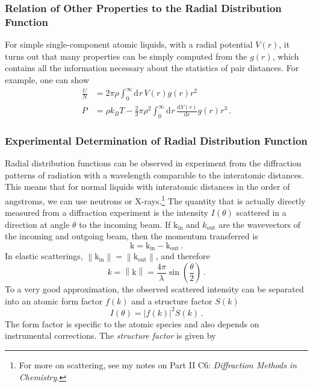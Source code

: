 \documentclass{article}
\theoremstyle{plain}\theoremheaderfont{\normalfont\itshape}\theorembodyfont{\rmfamily}\theoremseparator{.}\newtheorem*{rem}{Remark}\newtheorem*{ex}{Example}\newtheorem*{proof}{Proof}\newtheorem*{altp}{Alternative proof}
\theoremstyle{plain}\theoremheaderfont{\normalfont\bfseries}\theorembodyfont{\rmfamily}\theoremseparator{.}\newtheorem{thm}{Theorem}[section]\newtheorem{lem}[thm]{Lemma}\newtheorem{prop}[thm]{Proposition}\newtheorem*{cor}{Corollary}\newtheorem{defn}[thm]{Definition}\newtheorem{clm}[thm]{Claim}\newtheorem{clminproof}{Claim}\newtheorem{alg}[thm]{Algorithm}\newtheorem{hyp}[thm]{Hypothesis}\newtheorem{law}[thm]{Law}
\theoremstyle{break}\theoremheaderfont{\normalfont\itshape}\theorembodyfont{\rmfamily}\theoremseparator{.\medskip}\newtheorem*{proofskip}{Proof}\newtheorem*{exs}{Examples}\newtheorem*{rems}{Remarks}
\theoremstyle{break}\theoremheaderfont{\normalfont\bfseries}\theorembodyfont{\rmfamily}\theoremseparator{.\medskip}\newtheorem{lemskip}[thm]{Lemma}\newtheorem{defnskip}[thm]{Definition}\newtheorem{propskip}[thm]{Proposition}\newtheorem{thmskip}[thm]{Theorem}
\numberwithin{equation}{section}
\newcommand{\dd}[2][]{\mathrm{d}^{#1} #2\,}
\newcommand{\dv}[3][]{\frac{\mathrm{d}^{#1} #2}{{\mathrm{d} #3}^{#1}}}
\newcommand{\vb}[1]{\bm{\mathrm{#1}}}
\newcommand{\abs}[1]{\left| #1 \right|}
\newcommand{\norm}[1]{\left\| #1 \right\|}
\begin{document}
    \subsubsection{Relation of Other Properties to the Radial Distribution Function}
    For simple single-component atomic liquids, with a radial potential \(V(r)\), it turns out that many properties can be simply computed from the \(g(r)\), which contains all the information necessary about the statistics of pair distances. For example, one can show
    \begin{align}
        \frac{U}{N}&=2\pi\rho\int_{0}^{\infty}\dd{r}V(r)g(r)r^2\\
        P&=\rho k_B T-\frac{2}{3}\pi\rho^2\int_{0}^{\infty}\dd{r}\dv{V(r)}{r}g(r)r^3\,.
    \end{align}

    \subsubsection{Experimental Determination of Radial Distribution Function}
    Radial distribution functions can be observed in experiment from the diffraction patterns of radiation with a wavelength comparable to the interatomic distances. This means that for normal liquids with interatomic distances in the order of angstroms, we can use neutrons or X-rays.\footnote{For more on scattering, see my notes on Part II C6: \textit{Diffraction Methods in Chemistry}.} The quantity that is actually directly measured from a diffraction experiment is the intensity \(I(\theta)\) scattered in a direction at angle \(\theta\) to the incoming beam. If \(\vb{k}_{\text{in}}\) and \(k_{\text{out}}\) are the wavevectors of the incoming and outgoing beam, then the momentum transferred is
    \begin{equation}
        \vb{k}=\vb{k}_{\text{in}}-\vb{k}_{\text{out}}\,.
    \end{equation}
    In elastic scatterings, \(\norm{\vb{k}_{\text{in}}}=\norm{\vb{k}_{\text{out}}}\), and therefore
    \begin{equation}
        k=\norm{\vb{k}}=\frac{4\pi}{\lambda}\sin\left(\frac{\theta}{2}\right)\,.
    \end{equation}
    To a very good approximation, the observed scattered intensity can be separated into an atomic form factor \(f(k)\) and a structure factor \(S(k)\)
    \begin{equation}
        I(\theta)=\abs{f(k)}^2 S(k)\,.
    \end{equation}
    The form factor is specific to the atomic species and also depends on instrumental corrections. The \textit{structure factor} is given by
\end{document}
